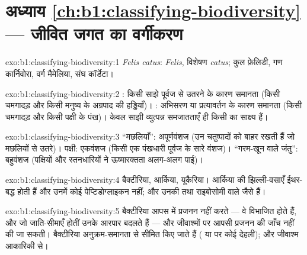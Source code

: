 \section*{अध्याय \ref{ch:b1:classifying-biodiversity} --- जीवित जगत का वर्गीकरण}

\begin{solution}{exo:b1:classifying-biodiversity:1}
\emph{Felis catus}:  \emph{Felis}, विशेषण \emph{catus}; कुल
फ़ेलिडी, गण कार्निवोरा, वर्ग मैमेलिया, संघ कॉर्डेटा।
\end{solution}

\begin{solution}{exo:b1:classifying-biodiversity:2}
: किसी साझे पूर्वज से उतरने के कारण समानता (किसी चमगादड़ और किसी
मनुष्य के अग्रपाद की हड्डियाँ)। : अभिसरण या
प्रत्यावर्तन के कारण समानता (किसी चमगादड़ और किसी पक्षी के पंख)। केवल साझी
व्युत्पन्न समजातताएँ ही किसी  का साक्ष्य हैं।
\end{solution}

\begin{solution}{exo:b1:classifying-biodiversity:3}
``मछलियाँ'': अपूर्णवंशज (उन चतुष्पादों को बाहर रखती हैं जो मछलियों से
उतरे)। पक्षी: एकवंशज (किसी एक पंखधारी पूर्वज के सारे
वंशज)। ``गरम-खून वाले जंतु'': बहुवंशज (पक्षियों और स्तनधारियों ने
ऊष्मारक्तता अलग-अलग पाई)।
\end{solution}

\begin{solution}{exo:b1:classifying-biodiversity:4}
बैक्टीरिया, आर्किया, यूकैरिया। आर्किया की झिल्ली-वसाएँ ईथर-बद्ध होती हैं
और उनमें कोई पेप्टिडोग्लाइकन नहीं; और उनकी  तथा राइबोसोमी
  वाले जैसे हैं।
\end{solution}

\begin{solution}{exo:b1:classifying-biodiversity:5}
बैक्टीरिया आपस में प्रजनन नहीं करते --- वे विभाजित होते हैं, और जो
जाति-सीमाएँ होतीं उनके आरपार  बदलते हैं --- और जीवाश्मों पर
आपसी प्रजनन की जाँच नहीं की जा सकती। बैक्टीरिया अनुक्रम-समानता से
सीमित किए जाते हैं ( या  पर कोई देहली); और जीवाश्म
आकारिकी से।
\end{solution}


